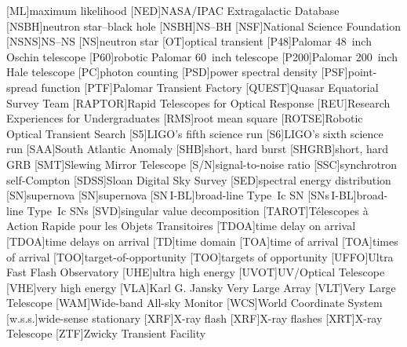 \begin{acronym}
[ML]{maximum likelihood}
[NED]{NASA/IPAC Extragalactic Database}
[NSBH]{neutron star\nobreakdashes--black hole}
[NSBH]{\acl{NS}\nobreakdashes--\acl{BH}}
[NSF]{National Science Foundation}
[NSNS]{\acl{NS}\nobreakdashes--\acl{NS}}
[NS]{neutron star}
[OT]{optical transient}
[P48]{Palomar 48~inch Oschin telescope}
[P60]{robotic Palomar 60~inch telescope}
[P200]{Palomar 200~inch Hale telescope}
[PC]{photon counting}
[PSD]{power spectral density}
[PSF]{point-spread function}
[PTF]{Palomar Transient Factory}
[QUEST]{Quasar Equatorial Survey Team}
[RAPTOR]{Rapid Telescopes for Optical Response}
[REU]{Research Experiences for Undergraduates}
[RMS]{root mean square}
[ROTSE]{Robotic Optical Transient Search}
[S5]{\ac{LIGO}'s fifth science run}
[S6]{\ac{LIGO}'s sixth science run}
[SAA]{South Atlantic Anomaly}
[SHB]{short, hard burst}
[SHGRB]{short, hard \acl{GRB}}
[SMT]{Slewing Mirror Telescope}
[S/N]{signal\nobreakdashes-to\nobreakdashes-noise ratio}
[SSC]{synchrotron self\nobreakdashes-Compton}
[SDSS]{Sloan Digital Sky Survey}
[SED]{spectral energy distribution}
[SN]{supernova}
[SN]{supernova}
[\acs{SN}\,I\nobreakdashes-BL]{broad\nobreakdashes-line Type~Ic \ac{SN}}
[\acsp{SN}\,I\nobreakdashes-BL]{broad\nobreakdashes-line Type~Ic \acp{SN}}
[SVD]{singular value decomposition}
[TAROT]{T\'{e}lescopes \`{a} Action Rapide pour les Objets Transitoires}
[TDOA]{time delay on arrival}
[TDOA]{time delays on arrival}
[TD]{time domain}
[TOA]{time of arrival}
[TOA]{times of arrival}
[TOO]{target\nobreakdashes-of\nobreakdashes-opportunity}
[TOO]{targets of opportunity}
[UFFO]{Ultra Fast Flash Observatory}
[UHE]{ultra high energy}
[UVOT]{UV/Optical Telescope}
[VHE]{very high energy}
[VLA]{Karl G. Jansky Very Large Array}
[VLT]{Very Large Telescope}
[WAM]{Wide\nobreakdashes-band All\nobreakdashes-sky Monitor}
[WCS]{World Coordinate System}
[w.s.s.]{wide\nobreakdashes-sense stationary}
[XRF]{X\nobreakdashes-ray flash}
[XRF]{X\nobreakdashes-ray flashes}
[XRT]{X\nobreakdashes-ray Telescope}
[ZTF]{Zwicky Transient Facility}
\end{acronym}
